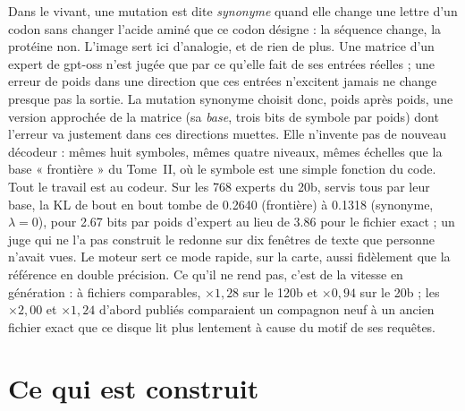 \begin{enbref}
Dans le vivant, une mutation est dite \emph{synonyme} quand elle change une lettre d'un codon sans changer l'acide aminé que ce codon désigne : la séquence change, la protéine non. L'image sert ici d'analogie, et de rien de plus. Une matrice d'un expert de gpt-oss n'est jugée que par ce qu'elle fait de ses entrées réelles ; une erreur de poids dans une direction que ces entrées n'excitent jamais ne change presque pas la sortie. La mutation synonyme choisit donc, poids après poids, une version approchée de la matrice (sa \emph{base}, trois bits de symbole par poids) dont l'erreur va justement dans ces directions muettes. Elle n'invente pas de nouveau décodeur : mêmes huit symboles, mêmes quatre niveaux, mêmes échelles que la base « frontière » du Tome~II, où le symbole est une simple fonction du code. Tout le travail est au codeur. Sur les \num{768} experts du 20b, servis tous par leur base, la KL de bout en bout tombe de \num{0.2640} (frontière) à \num{0.1318} (synonyme, $\lambda = 0$), pour \num{2.67} bits par poids d'expert au lieu de \num{3.86} pour le fichier exact ; un juge qui ne l'a pas construit le redonne sur dix fenêtres de texte que personne n'avait vues. Le moteur sert ce mode rapide, sur la carte, aussi fidèlement que la référence en double précision. Ce qu'il ne rend pas, c'est de la vitesse en génération : à fichiers comparables, $\times 1{,}28$ sur le 120b et $\times 0{,}94$ sur le 20b ; les $\times 2{,}00$ et $\times 1{,}24$ d'abord publiés comparaient un compagnon neuf à un ancien fichier exact que ce disque lit plus lentement à cause du motif de ses requêtes.
\end{enbref}

\section{Ce qui est construit}\label{t3sno:sec:construit}

